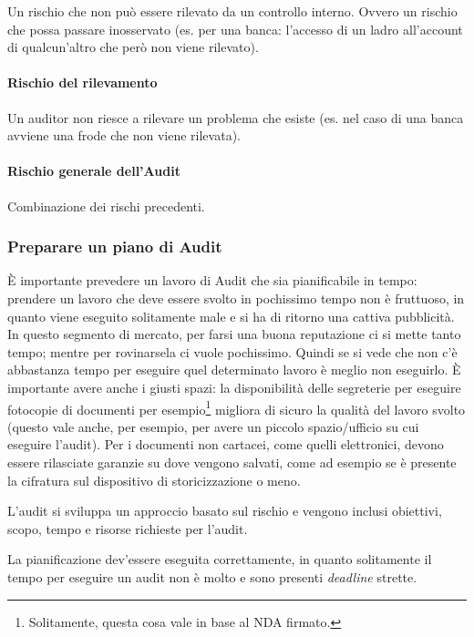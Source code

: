 Un rischio che non può essere rilevato da un controllo interno. Ovvero un 
rischio che possa passare inosservato (es. per una banca: l'accesso di un ladro 
all'account di qualcun'altro che però non viene rilevato).


\paragraph*{Rischio del rilevamento}

Un auditor non riesce a rilevare un problema che esiste (es. nel caso 
di una banca avviene una frode che non viene rilevata).

\paragraph*{Rischio generale dell'Audit}

Combinazione dei rischi precedenti.


\subsubsection{Preparare un piano di Audit}

È importante prevedere un lavoro di Audit che sia pianificabile in tempo: 
prendere un lavoro che deve essere svolto in pochissimo tempo non è 
fruttuoso, in quanto viene eseguito solitamente male e si ha di 
ritorno una cattiva pubblicità. In questo segmento di mercato, per farsi una buona 
reputazione ci si mette tanto tempo; mentre per rovinarsela ci vuole pochissimo. 
Quindi se si vede che non c'è abbastanza tempo per eseguire quel determinato 
lavoro è meglio non eseguirlo. 
È importante avere anche i giusti spazi: la disponibilità delle segreterie per 
eseguire fotocopie di documenti per esempio\footnote{Solitamente, questa cosa 
vale in base al NDA firmato.} migliora di sicuro la qualità del lavoro svolto 
(questo vale anche, per esempio, per avere un piccolo spazio/ufficio su cui 
eseguire l'audit). Per i documenti non cartacei, come quelli elettronici, 
devono essere rilasciate garanzie su dove vengono salvati, come ad esempio se è 
presente la cifratura sul dispositivo di storicizzazione o meno.

L'audit si sviluppa un approccio basato sul rischio e vengono inclusi 
obiettivi, scopo, tempo e risorse richieste per l'audit.

La pianificazione dev'essere eseguita correttamente, in quanto solitamente il 
tempo per eseguire un audit non è molto e sono presenti \textit{deadline} 
strette.

